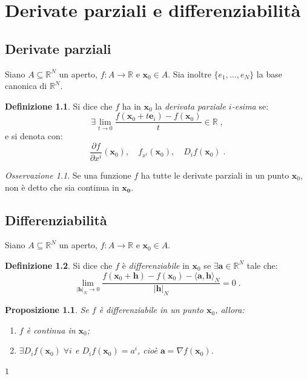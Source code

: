 \documentclass[a4paper,12pt]{report}
\theoremstyle{plain}
\newtheorem{prop}{Proposizione}[section]
\theoremstyle{definition}
\newtheorem{defn}{Definizione}[section]
\theoremstyle{remark}
\newtheorem{oss}{Osservazione}[section]
\numberwithin{equation}{section}
\begin{document}
\chapter{Derivate parziali e differenziabilità}
\section{Derivate parziali}
Siano $A \subseteq \mathbb{R}^N$ un aperto, $f:A\to \mathbb{R}$ e $\mathbf{x}_0 \in A$. Sia inoltre $\{e_1,\ldots,e_N\}$ la base 
canonica di $\mathbb{R}^{N}$.
\begin{defn} Si dice che $f$ ha in $\mathbf{x}_0$ la \textit{derivata parziale $i$-esima} se:
\begin{equation}
\exists \lim_{t \to 0} \frac{f(\mathbf{x}_0+t\mathbf{e}_i)-f(\mathbf{x}_0)}{t} \in \mathbb{R}\;,
\end{equation}
e si denota con:
\begin{equation}
\frac{\partial f}{\partial x^i}(\mathbf{x}_0), \quad f_{x^i}(\mathbf{x}_0), \quad D_i f(\mathbf{x}_0)\;.
\end{equation}
\end{defn}
\begin{oss} Se una funzione $f$ ha tutte le derivate parziali in un punto $\mathbf{x}_0$, non è detto che sia continua in $\mathbf{x_0}$.
\end{oss}
\section{Differenziabilità}
Siano $A \subseteq \mathbb{R}^N$ un aperto, $f:A \to \mathbb{R}$ e $\mathbf{x}_0 \in A$.
\begin{defn} Si dice che $f$ è \textit{differenziabile} in $\mathbf{x}_0$ se $\exists \mathbf{a} \in \mathbb{R}^N$ tale che:
\begin{equation}
\lim_{|\mathbf{h}|_N\to 0} \frac{f(\mathbf{x}_0+\mathbf{h})-f(\mathbf{x}_0)-\langle \mathbf{a},\mathbf{h}\rangle_N}{|\mathbf{h}|_N}=0\;.
\end{equation}
\end{defn}
\begin{prop} Se $f$ è differenziabile in un punto $\mathbf{x}_0$, allora:
\begin{enumerate}
 \item $f$ è continua in $\mathbf{x}_0$;
 \item $\exists D_i f(\mathbf{x}_0)\; \forall i$ e $D_i f(\mathbf{x}_0)=a^i$, cioè $\mathbf{a}=\nabla f(\mathbf{x}_0)$.
\end{enumerate}
\end{prop}
\proof $1$ \\
\end{document}
